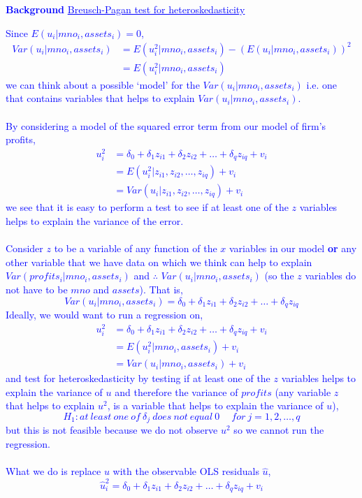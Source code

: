 \documentclass[12pt]{report}
\newenvironment{blueframed}[1][blue]
{\def\FrameCommand{\fboxsep=\FrameSep\fcolorbox{#1}{white}}%
\MakeFramed {\advance\hsize-\width \FrameRestore}}
{\endMakeFramed}
\begin{document}
\newpage
\justify
\begin{blueframed}
	\textcolor{blue}{\textbf{Background}}
	\vspace{-\baselineskip}
	\justify
	\textcolor{blue}{\underline{Breusch-Pagan test for heteroskedasticity}}
	
	\noindent \textcolor{blue}
	{
		\noindent Since $E(u_i|mno_i,assets_i)=0$, 
		\begin{align*}
		Var(u_i|mno_i,assets_i) &= E(u^2_i|mno_i,assets_i) - (E(u_i|mno_i,assets_i))^2 \\
		&= E(u^2_i|mno_i,assets_i)
		\end{align*}
		\noindent we can think about a possible `model' for the $Var(u_i|mno_i,assets_i)$ i.e. one that contains variables that helps to explain $Var(u_i|mno_i,assets_i)$. \\ \\ By considering a model of the squared error term from our model of firm's profits, 
		\begin{align*}
		u^2_i &= \delta_0 + \delta_1z_{i1} + \delta_2z_{i2} + \dots + \delta_qz_{iq} + v_i \\
		&= E(u^2_i|z_{i1},z_{i2},\dots,z_{iq}) + v_i \\ 
		&= Var(u_i|z_{i1},z_{i2},\dots,z_{iq}) + v_i
		\end{align*} we see that it is easy to perform a test to see if at least one of the $z$ variables helps to explain the variance of the error. 
		\\ \\ Consider $z$ to be a variable of any function of the $x$ variables in our model \textbf{or} any other variable that we have data on which we think can help to explain $Var(profits_i|mno_i,assets_i)$ and $\therefore$ $Var(u_i|mno_i,assets_i)$ (so the $z$ variables do not have to be $mno$ and $assets$). That is, $$Var(u_i|mno_i,assets_i) = \delta_0 + \delta_1z_{i1} + \delta_2z_{i2} + \dots + \delta_qz_{iq}$$
		\noindent Ideally, we would want to run a regression on,
		\begin{align*}
		u^2_i &= \delta_0 + \delta_1z_{i1} + \delta_2z_{i2} + \dots + \delta_qz_{iq} + v_i \\
		&= E(u^2_i|mno_i,assets_i) + v_i \\
		&= Var(u_i|mno_i,assets_i) + v_i
		\end{align*}
		\noindent and test for heteroskedasticity by testing if at least one of the $z$ variables helps to explain the variance of $u$ and therefore the variance of $profits$ (any variable $z$ that helps to explain $u^2$, is a variable that helps to explain the variance of $u$), $$H_1: at\ least\ one\ of\ \delta_j\ does\ not\ equal\ 0\ \quad for\ j=1,2,\dots,q$$ but this is not feasible because we do not observe $u^2$ so we cannot run the regression.
		\\ \\ What we do is replace $u$ with the observable OLS residuals $\hat{u}$,
		$$\hat{u}^2_i = \delta_0 + \delta_1z_{i1} + \delta_2z_{i2} + \dots + \delta_qz_{iq} + v_i$$
	}
\end{blueframed}
\end{document}
